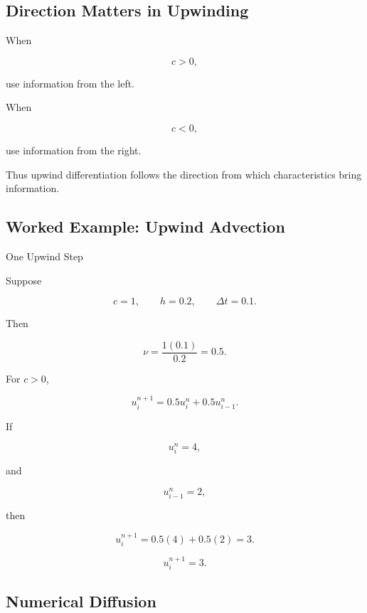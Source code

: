 \subsection{Direction Matters in Upwinding}
\label{subsec:upwind-direction}

When

\[
c>0,
\]

use information from the left.

When

\[
c<0,
\]

use information from the right.

Thus upwind differentiation follows the direction from which
characteristics bring information.

\subsection{Worked Example: Upwind Advection}
\label{subsec:worked-upwind-advection}

\begin{workedexamplebox}{One Upwind Step}

Suppose

\[
c=1,
\qquad
h=0.2,
\qquad
\Delta t=0.1.
\]

Then

\[
\nu
=
\frac{1(0.1)}{0.2}
=
0.5.
\]

For \(c>0\),

\[
u_i^{n+1}
=
0.5u_i^n
+
0.5u_{i-1}^n.
\]

If

\[
u_i^n=4,
\]

and

\[
u_{i-1}^n=2,
\]

then

\[
u_i^{n+1}
=
0.5(4)+0.5(2)
=
3.
\]

\begin{answerbox}
\[
\boxed{
u_i^{n+1}=3.
}
\]
\end{answerbox}

\end{workedexamplebox}

\subsection{Numerical Diffusion}
\label{subsec:numerical-diffusion}

